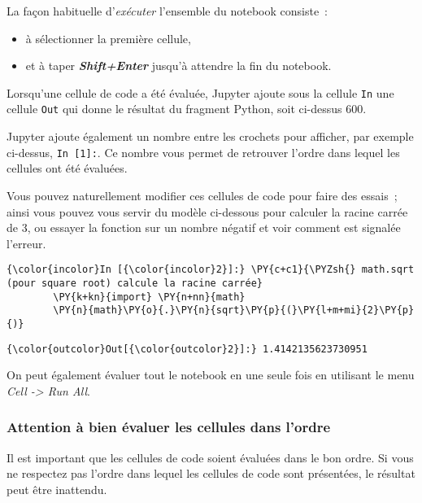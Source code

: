     La façon habituelle d'\emph{exécuter} l'ensemble du notebook consiste~:

\begin{itemize}
\tightlist
\item
  à sélectionner la première cellule,
\item
  et à taper \textbf{\emph{Shift+Enter}} jusqu'à attendre la fin du
  notebook.
\end{itemize}

    Lorsqu'une cellule de code a été évaluée, Jupyter ajoute sous la cellule
\texttt{In} une cellule \texttt{Out} qui donne le résultat du fragment
Python, soit ci-dessus 600.

Jupyter ajoute également un nombre entre les crochets pour afficher, par
exemple ci-dessus, \texttt{In\ {[}1{]}:}. Ce nombre vous permet de
retrouver l'ordre dans lequel les cellules ont été évaluées.

    Vous pouvez naturellement modifier ces cellules de code pour faire des
essais~; ainsi vous pouvez vous servir du modèle ci-dessous pour
calculer la racine carrée de 3, ou essayer la fonction sur un nombre
négatif et voir comment est signalée l'erreur.

    \begin{Verbatim}[commandchars=\\\{\}]
{\color{incolor}In [{\color{incolor}2}]:} \PY{c+c1}{\PYZsh{} math.sqrt (pour square root) calcule la racine carrée}
        \PY{k+kn}{import} \PY{n+nn}{math}
        \PY{n}{math}\PY{o}{.}\PY{n}{sqrt}\PY{p}{(}\PY{l+m+mi}{2}\PY{p}{)}
\end{Verbatim}


\begin{Verbatim}[commandchars=\\\{\}]
{\color{outcolor}Out[{\color{outcolor}2}]:} 1.4142135623730951
\end{Verbatim}
            
    On peut également évaluer tout le notebook en une seule fois en
utilisant le menu \emph{Cell -\textgreater{} Run All}.

    \hypertarget{attention-uxe0-bien-uxe9valuer-les-cellules-dans-lordre}{%
\subsubsection{Attention à bien évaluer les cellules dans
l'ordre}\label{attention-uxe0-bien-uxe9valuer-les-cellules-dans-lordre}}

    Il est important que les cellules de code soient évaluées dans le bon
ordre. Si vous ne respectez pas l'ordre dans lequel les cellules de code
sont présentées, le résultat peut être inattendu.

